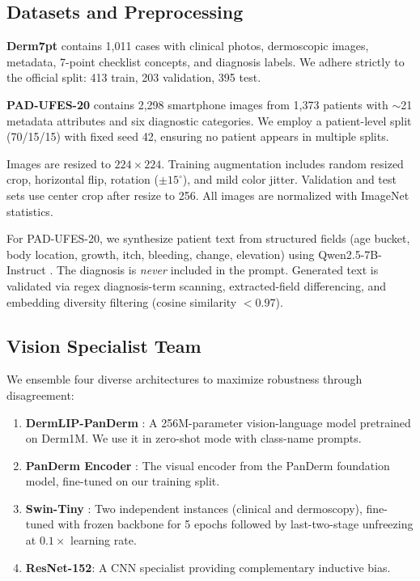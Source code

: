 \documentclass[conference]{IEEEtran}
\begin{document}
\subsection{Datasets and Preprocessing}

\textbf{Derm7pt} \cite{kawahara2018} contains 1,011 cases with clinical photos, dermoscopic images, metadata, 7-point checklist concepts, and diagnosis labels. We adhere strictly to the official split: 413 train, 203 validation, 395 test.

\textbf{PAD-UFES-20} \cite{pacheco2020} contains 2,298 smartphone images from 1,373 patients with $\sim$21 metadata attributes and six diagnostic categories. We employ a patient-level split (70/15/15) with fixed seed 42, ensuring no patient appears in multiple splits.

Images are resized to $224 \times 224$. Training augmentation includes random resized crop, horizontal flip, rotation ($\pm 15^\circ$), and mild color jitter. Validation and test sets use center crop after resize to 256. All images are normalized with ImageNet statistics.

For PAD-UFES-20, we synthesize patient text from structured fields (age bucket, body location, growth, itch, bleeding, change, elevation) using Qwen2.5-7B-Instruct \cite{qwen2024}. The diagnosis is \textit{never} included in the prompt. Generated text is validated via regex diagnosis-term scanning, extracted-field differencing, and embedding diversity filtering (cosine similarity $< 0.97$).

\subsection{Vision Specialist Team}

We ensemble four diverse architectures to maximize robustness through disagreement:

\begin{enumerate}
    \item \textbf{DermLIP-PanDerm} \cite{yan2025}: A 256M-parameter vision-language model pretrained on Derm1M. We use it in zero-shot mode with class-name prompts.
    \item \textbf{PanDerm Encoder} \cite{yan2025}: The visual encoder from the PanDerm foundation model, fine-tuned on our training split.
    \item \textbf{Swin-Tiny} \cite{liu2021}: Two independent instances (clinical and dermoscopy), fine-tuned with frozen backbone for 5 epochs followed by last-two-stage unfreezing at $0.1\times$ learning rate.
    \item \textbf{ResNet-152}: A CNN specialist providing complementary inductive bias.
\end{enumerate}
\end{document}

